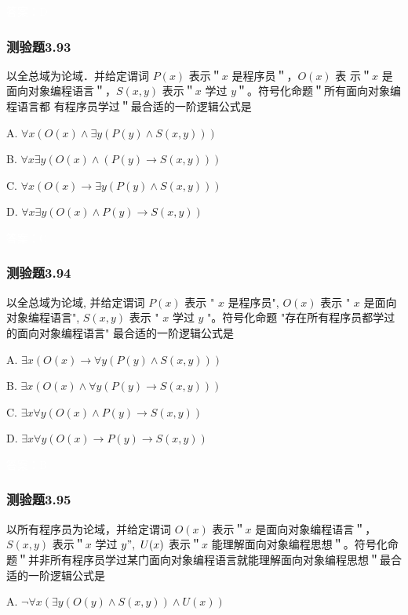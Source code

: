 \documentclass[UTF8, heading=true]{ctexart}
\begin{document}
\textcolor{white}{答案：D}

\subsubsection{测验题3.93}

以全总域为论域．并给定谓词 $P(x)$ 表示＂$x$ 是程序员＂，$O(x)$ 表
示＂$x$ 是面向对象编程语言＂，$S(x, y)$ 表示＂$x$ 学过 $y$＂。符号化命题＂所有面向对象编程语言都
有程序员学过＂最合适的一阶逻辑公式是 $\qquad$

A. $\forall x(O(x) \wedge \exists y(P(y) \wedge S(x, y)))$

B. $\forall x \exists y(O(x) \wedge(P(y) \rightarrow S(x, y)))$

C. $\forall x(O(x) \rightarrow \exists y(P(y) \wedge S(x, y)))$

D. $\forall x \exists y(O(x) \wedge P(y) \rightarrow S(x, y))$

\textcolor{white}{答案：C}

\subsubsection{测验题3.94}

以全总域为论域, 并给定谓词 $P(x)$ 表示 " $x$ 是程序员", $O(x)$ 表示 " $x$ 是面向对象编程语言", $S(x, y)$ 表示 " $x$ 学过 $y$ "。符号化命题 "存在所有程序员都学过的面向对象编程语言" 最合适的一阶逻辑公式是 $\qquad$

A. $\exists x(O(x) \rightarrow \forall y(P(y) \wedge S(x, y)))$

B. $\exists x(O(x) \wedge \forall y(P(y) \rightarrow S(x, y)))$

C. $\exists x \forall y(O(x) \wedge P(y) \rightarrow S(x, y))$

D. $\exists x \forall y(O(x) \rightarrow P(y) \rightarrow S(x, y))$

\textcolor{white}{答案：B}


\subsubsection{测验题3.95}

以所有程序员为论域，并给定谓词 $O(x)$ 表示＂$x$ 是面向对象编程语言＂，$S(x, y)$ 表示＂$x$ 学过 $y ", ~ U(x)$ 表示＂$x$ 能理解面向对象编程思想＂。符号化命题＂并非所有程序员学过某门面向对象编程语言就能理解面向对象编程思想＂最合适的一阶逻辑公式是 $\qquad$

A. $
\neg \forall x(\exists y(O(y) \wedge S(x, y)) \wedge U(x))
$
\end{document}
